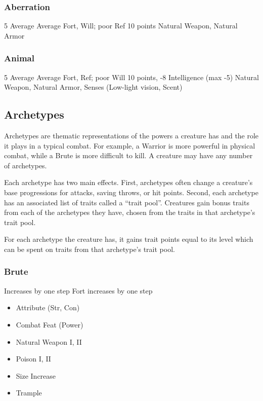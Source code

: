 \subsubsection{Aberration}
 5
 Average
 Average Fort, Will; poor Ref
 10 points
 Natural Weapon, Natural Armor

\subsubsection{Animal}
 5
 Average
 Average Fort, Ref; poor Will
 10 points, -8 Intelligence (max -5)
 Natural Weapon, Natural Armor, Senses (Low-light vision, Scent)

\subsection{Archetypes}
Archetypes are thematic representations of the powers a creature has and the role it plays in a typical combat. For example, a Warrior is more powerful in physical combat, while a Brute is more difficult to kill. A creature may have any number of archetypes.

Each archetype has two main effects. First, archetypes often change a creature's base progressions for attacks, saving throws, or hit points. Second, each archetype has an associated list of traits called a ``trait pool''. Creatures gain bonus traits from each of the archetypes they have, chosen from the traits in that archetype's trait pool.

For each archetype the creature has, it gains trait points equal to its level which can be spent on traits from that archetype's trait pool.

\subsubsection{Brute}
 Increases by one step
 Fort increases by one step
\begin{itemize}
    \item Attribute (Str, Con)
    \item Combat Feat (Power)
    \item Natural Weapon I, II
    \item Poison I, II
    \item Size Increase
    \item Trample
\end{itemize}

